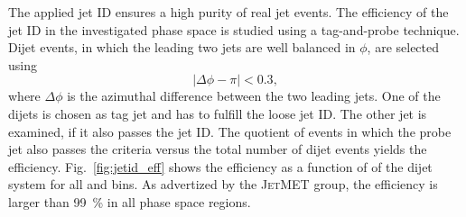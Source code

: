 The applied jet ID ensures a high purity of real jet events. The efficiency of
the jet ID in the investigated phase space is studied using a
tag-and-probe technique. Dijet events, in which the leading two jets are well
balanced in $\phi$, are selected using
%
\begin{equation*}
    | \Delta\phi - \pi | < 0.3,
\end{equation*}
%
where $\Delta\phi$ is the azimuthal difference between the two leading jets. One
of the dijets is chosen as tag jet and has to fulfill the loose jet ID. The
other jet is examined, if it also passes the jet ID. The quotient of events in
which the probe jet also passes the criteria versus the total number of dijet
events yields the efficiency. Fig.~\ref{fig:jetid_eff} shows the
efficiency as a function of \ptavg of the dijet system for all \ystar and
\yboost bins. As advertized by the \textsc{JetMET} group, the efficiency is
larger than \SI{99}{\percent} in all phase space regions.

